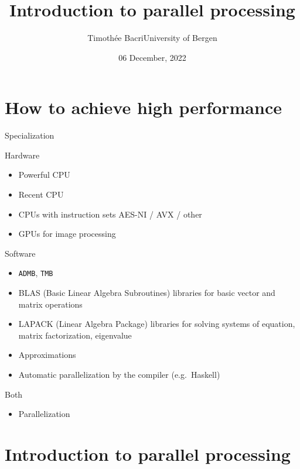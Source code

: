 \documentclass[
  ignorenonframetext,
  usenames,
  dvipsnames]{beamer}
\title{Introduction to parallel processing}
\author{Timothée Bacri\newline University of Bergen}
\date{06 December, 2022}
\providecommand{\tightlist}{%
  \setlength{\itemsep}{0pt}\setlength{\parskip}{0pt}}
\begin{document}
\frame{\titlepage}

\hypertarget{how-to-achieve-high-performance}{%
\section{How to achieve high
performance}\label{how-to-achieve-high-performance}}

\begin{frame}[fragile]{Specialization}
\protect\hypertarget{specialization}{}
\small

\begin{block}{Hardware}
\protect\hypertarget{hardware}{}
\begin{itemize}
\tightlist
\item
  Powerful CPU
\item
  Recent CPU
\item
  CPUs with instruction sets AES-NI / AVX / other
\item
  GPUs for image processing
\end{itemize}
\end{block}

\begin{block}{Software}
\protect\hypertarget{software}{}
\begin{itemize}
\tightlist
\item
  \texttt{ADMB}, \texttt{TMB}
\item
  BLAS (Basic Linear Algebra Subroutines) libraries for basic vector and
  matrix operations
\item
  LAPACK (Linear Algebra Package) libraries for solving systems of
  equation, matrix factorization, eigenvalue
\item
  Approximations
\item
  Automatic parallelization by the compiler (e.g.~Haskell)
\end{itemize}
\end{block}

\begin{block}{Both}
\protect\hypertarget{both}{}
\begin{itemize}
\tightlist
\item
  Parallelization
\end{itemize}

\normalsize
\end{block}
\end{frame}

\hypertarget{introduction-to-parallel-processing}{%
\section{Introduction to parallel
processing}\label{introduction-to-parallel-processing}}
\end{document}
